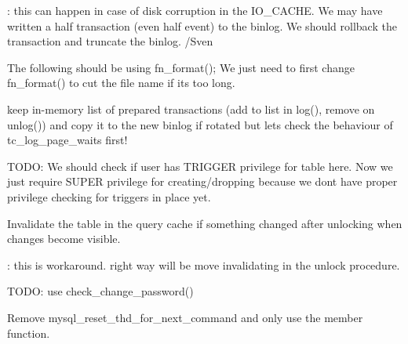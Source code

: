 \begin{DoxyRefList}
\+: this can happen in case of disk corruption in the I\+O\+\_\+\+C\+A\+C\+HE. We may have written a half transaction (even half event) to the binlog. We should rollback the transaction and truncate the binlog. /\+Sven  
\item[\label{todo__todo000005}%
\Hypertarget{todo__todo000005}%
Member \mbox{\hyperlink{group__Binary__Log_gabcd5b380680e537bdec0f093a8f2e3d6}{M\+Y\+S\+Q\+L\+\_\+\+B\+I\+N\+\_\+\+L\+OG\+:\+:generate\+\_\+name}} (const char $\ast$log\+\_\+name, const char $\ast$suffix, char $\ast$buff)]The following should be using fn\+\_\+format(); We just need to first change fn\+\_\+format() to cut the file name if it\textquotesingle{}s too long.  
\item[\label{todo__todo000008}%
\Hypertarget{todo__todo000008}%
Member \mbox{\hyperlink{group__Binary__Log_ga44de4e3109fc4d50d4968191ab0f3544}{M\+Y\+S\+Q\+L\+\_\+\+B\+I\+N\+\_\+\+L\+OG\+:\+:open\+\_\+binlog}} (const char $\ast$opt\+\_\+name)]keep in-\/memory list of prepared transactions (add to list in log(), remove on unlog()) and copy it to the new binlog if rotated but let\textquotesingle{}s check the behaviour of tc\+\_\+log\+\_\+page\+\_\+waits first!  
\item[\label{todo__todo000121}%
\Hypertarget{todo__todo000121}%
Member \mbox{\hyperlink{sql__trigger_8h_a1e3f2ad15ed49c6bd2a89fd4562ee8e5}{mysql\+\_\+create\+\_\+or\+\_\+drop\+\_\+trigger}} (T\+HD $\ast$thd, \mbox{\hyperlink{structTABLE__LIST}{T\+A\+B\+L\+E\+\_\+\+L\+I\+ST}} $\ast$tables, bool create)]T\+O\+DO\+: We should check if user has T\+R\+I\+G\+G\+ER privilege for table here. Now we just require S\+U\+P\+ER privilege for creating/dropping because we don\textquotesingle{}t have proper privilege checking for triggers in place yet. 
\item[\label{todo__todo000101}%
\Hypertarget{todo__todo000101}%
Member \mbox{\hyperlink{group__Runtime__Environment_gac7751d9816645a7a68e879596ee7e558}{mysql\+\_\+execute\+\_\+command}} (T\+HD $\ast$thd, bool first\+\_\+level)]
\begin{DoxyItemize}
\item Invalidate the table in the query cache if something changed after unlocking when changes become visible. 
\end{DoxyItemize}

\+: this is workaround. right way will be move invalidating in the unlock procedure.
\begin{DoxyItemize}
\item T\+O\+DO\+: use check\+\_\+change\+\_\+password() 
\end{DoxyItemize}
\item[\label{todo__todo000102}%
\Hypertarget{todo__todo000102}%
Member \mbox{\hyperlink{group__Runtime__Environment_gab37db6950d3b6bc16bbbb2ae0484ae55}{mysql\+\_\+reset\+\_\+thd\+\_\+for\+\_\+next\+\_\+command}} (T\+HD $\ast$thd)]Remove mysql\+\_\+reset\+\_\+thd\+\_\+for\+\_\+next\+\_\+command and only use the member function.


\end{DoxyRefList}

